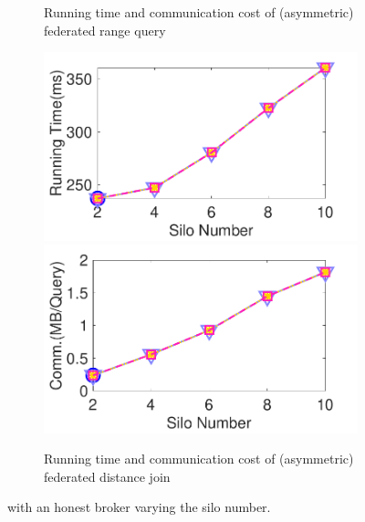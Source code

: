 \begin{figure}[t]
\begin{subfigure}{0.48\textwidth}
        \caption{Running time and communication cost of (asymmetric) federated range query}
        \label{fig:range-eff-silo-n-ho}
    \end{subfigure}
    \begin{subfigure}{0.48\textwidth}
        \centering
        \includegraphics[width=0.48\linewidth]{apdx/dj_silo_time.pdf}
        \includegraphics[width=0.48\linewidth]{apdx/dj_silo_cost.pdf}
        \caption{Running time and communication cost of (asymmetric) federated distance join}
    \end{subfigure}
    \caption{\sysname with an honest broker varying the silo number.}
    \label{fig:exp-honest-silo}
\end{figure}

